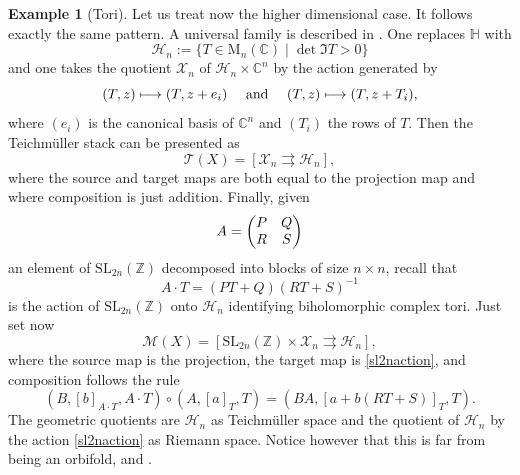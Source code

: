 \documentclass[10pt]{amsart}
\let\mathcal\mathscr
\def\mto{\mathchoice{\longmapsto}{\mapsto}{\mapsto}{\mapsto}}
\newcommand{\SL}{\mathrm{SL}}
\theoremstyle{plain}
\theoremstyle{definition}
\newtheorem{example}[theorem]{Example}
\theoremstyle{remark}
\numberwithin{equation}{section}
\newcommand{\CC}{{\mathbb{C}}}
\begin{document}
\begin{example}[Tori]
Let us treat now the higher dimensional case. It follows exactly the same pattern. A universal family is described in \cite[\S 5.2]{KodairaBook}. One replaces $\mathbb H$ with
\begin{equation}
\label{hdH}
\mathcal H_n:=\{T\in \text{M}_n(\CC)\mid \det \Im T >0\}
\end{equation}
and one takes the quotient $\mathcal X_n$ of $\mathcal H_n\times \CC^n$ by the action generated by
\begin{equation}
\label{hdtoriTeich}
(T,z)\mto (T, z+e_i)\quad\text{ and }\quad(T,z)\mto (T, z+T_i),
\end{equation}
where $(e_i)$ is the canonical basis of $\CC^n$ and $(T_i)$ the rows of $T$. Then the Teichmüller stack can be presented as
\begin{equation}
\label{hdtoriTgroupoid}
\mathcal T(X)=\left [\mathcal X_n\rightrightarrows \mathcal H_n\right],
\end{equation}
where the source and target maps are both equal to the projection map and where composition is just addition. Finally, given
\begin{equation}
\label{matrixAn}
A=\begin{pmatrix}
P &Q\cr
R &S
\end{pmatrix}
\end{equation}
an element of $\SL_{2n}(\mathbb Z)$ decomposed into blocks of size $n\times n$, recall that
\begin{equation}
\label{sl2naction}
A\cdot T=(PT+Q)(RT+S)^{-1}
\end{equation}
is the action of $\SL_{2n}(\mathbb Z)$ onto $\mathcal H_n$ identifying biholomorphic complex tori.
Just set now\vspace*{-3pt}
\begin{equation}
\label{hdtoriMgroupoid}
\mathcal M(X)=\left[\SL_{2n}(\mathbb Z)\times\mathcal X_n\rightrightarrows \mathcal H_n\right ],
\end{equation}
where the source map is the projection, the target map is \eqref{sl2naction}, and composition follows the rule\vspace*{-3pt}\enlargethispage{.5\baselineskip}%
\begin{equation}
\label{hdcomptori}
(B,[b]_{A\cdot T},A\cdot T)\circ (A,[a]_T, T)=(BA,[a+b(RT+S)]_T, T).
\end{equation}
The geometric quotients are $\mathcal H_n$ as Teichmüller space and the quotient of $\mathcal H_n$ by the action \eqref{sl2naction} as Riemann space. Notice however that this is far from being an orbifold, \cf \cite[\S 5.2]{KodairaBook} and \cite{VerbitskyErgodic}.
\end{example}
\end{document}
